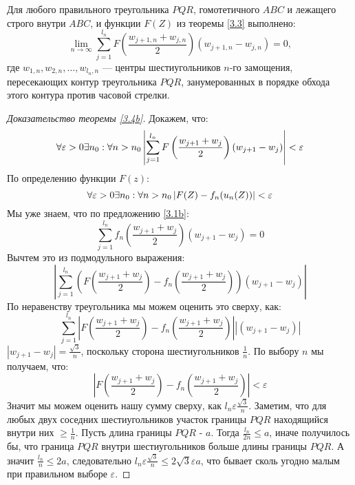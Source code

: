 \begin{suggestion} \label{3.4b}
Для любого правильного треугольника $PQR$, гомотетичного $ABC$ и лежащего строго внутри $ABC$, и функции $F(Z)$ из теоремы \ref{3.3} выполнено:
\begin{equation}
\lim_{n\to\infty} \sum\limits_{j=1}^{l_n} F\left(\frac{w_{j+1,n}+w_{j,n}}{2}\right) (w_{j+1,n}-w_{j,n})=0,
\end{equation}
где $w_{1,n},w_{2,n},\dots,w_{l_n,n}$ --- центры шестиугольников $n$-го замощения, пересекающих контур треугольника $PQR$, занумерованных в порядке обхода этого контура против часовой стрелки.
\end{suggestion}



\begin{proof}[Доказательство теоремы \ref{3.4b}] 
Докажем, что:
$$\forall \varepsilon > 0 \space \exists \space n_0 : \forall n > n_0 \left|\sum_{j=1}^{l_n} F \left( \frac{w_{j+1} + w_j}{2} \right) ({w_{j+1} - w_j}) \right| < \varepsilon$$
По определению функции $F(z)$:
$$\forall \varepsilon > 0 \space \exists \space n_0 : \forall n > n_0 \left| F(Z) - f_n(u_n(Z)) \right| < \varepsilon$$
Мы уже знаем, что по предложению \ref{3.1b}:
$$\sum_{j=1}^{l_n} f_n \left( \frac{w_{j+1} + w_j}{2} \right) ({w_{j+1} - w_j}) = 0$$
Вычтем это из подмодульного выражения:
$$\left|\sum_{j=1}^{l_n} \left( F \left( \frac{w_{j+1} + w_j}{2} \right) - f_n \left( \frac{w_{j+1} + w_j}{2} \right) \right) ({w_{j+1} - w_j}) \right|$$
По неравенству треугольника мы можем оценить это сверху, как:
$$
\sum_{j=1}^{l_n} \left| F \left( \frac{w_{j+1} + w_j}{2} \right) - f_n \left( \frac{w_{j+1} + w_j}{2} \right) \right| \left| ({w_{j+1} - w_j}) \right|    
$$
$|w_{j+1} - w_j| = \frac{\sqrt{3}}{n}$, поскольку сторона шестиугольников $\frac{1}{n}$. По выбору $n$ мы получаем, что: 
$$\left| F \left( \frac{w_{j+1} + w_j}{2} \right) - f_n \left( \frac{w_{j+1} + w_j}{2} \right) \right| < \varepsilon$$
Значит мы можем оценить нашу сумму сверху, как $l_n\varepsilon\frac{\sqrt{3}}{n}$.
Заметим, что для любых двух соседних шестиугольников участок границы $PQR$ находящийся внутри них $\geq \frac{1}{n}$. Пусть длина границы $PQR$ - $a$. Тогда $\frac{l_n}{2n} \leq a$, иначе получилось бы, что граница $PQR$ внутри шестиугольников больше длины границы $PQR$. А значит $\frac{l_n}{n} \leq 2a$, следовательно $l_n\varepsilon\frac{\sqrt{3}}{n} \leq 2\sqrt{3}\varepsilon a$, что бывает сколь угодно малым при правильном выборе $\varepsilon$.  
\end{proof}